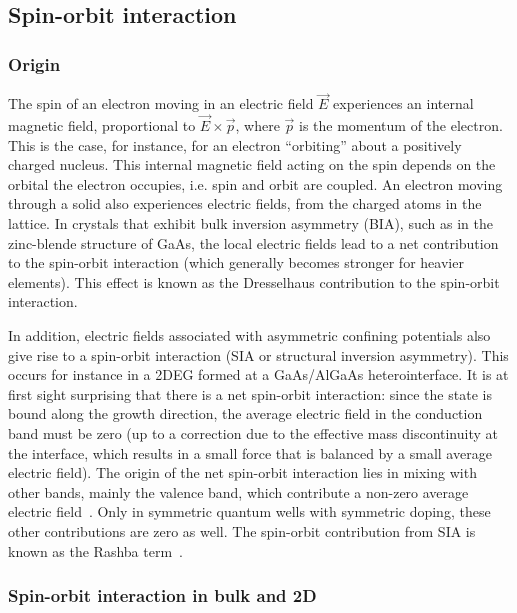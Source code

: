\documentclass[rmp,twocolumn,aps]{revtex4}
\begin{document}

\subsection{Spin-orbit interaction}
\label{Sec:spin-orbit}
\subsubsection{Origin}

The spin of an electron moving in an electric field $\vec{E}$
experiences an internal magnetic field, proportional to $\vec{E}
\times \vec{p}$, where $\vec{p}$ is the momentum of the electron.
This is the case, for instance, for an electron ``orbiting'' about
a positively charged nucleus. This internal magnetic field acting
on the spin depends on the orbital the electron occupies, i.e.
spin and orbit are coupled. An electron moving through a solid
also experiences electric fields, from the charged atoms in the
lattice. In crystals that exhibit bulk inversion asymmetry (BIA), such as in the zinc-blende structure of GaAs, the local electric fields lead to a net contribution to the spin-orbit interaction (which generally becomes stronger for heavier elements). This effect is  known as the Dresselhaus contribution to the spin-orbit interaction\cite{dresselhaus55,dyakonov86,wrinkler03}.

In addition, electric fields associated with asymmetric confining
potentials also give rise to a spin-orbit interaction (SIA or
structural inversion asymmetry). This occurs for instance in a
2DEG formed at a GaAs/AlGaAs heterointerface. It is at first sight surprising that there is a net spin-orbit interaction: since the state is bound along the growth direction, the average electric field in the conduction band must be zero (up to a correction due to the effective mass discontinuity at the interface, which results in a small force that is balanced by a small average electric field). The origin of the net spin-orbit interaction lies in mixing with other bands, mainly the valence band, which contribute a non-zero average electric field~\cite{wrinkler03,pfeffer99}.
Only in symmetric quantum wells with symmetric doping, these other contributions are zero as well. The spin-orbit contribution from SIA is known as the Rashba term~\cite{rashba60,bychkov84}.


\subsubsection{Spin-orbit interaction in bulk and 2D}
\label{sec:SO_bulk_2D}
\end{document}
